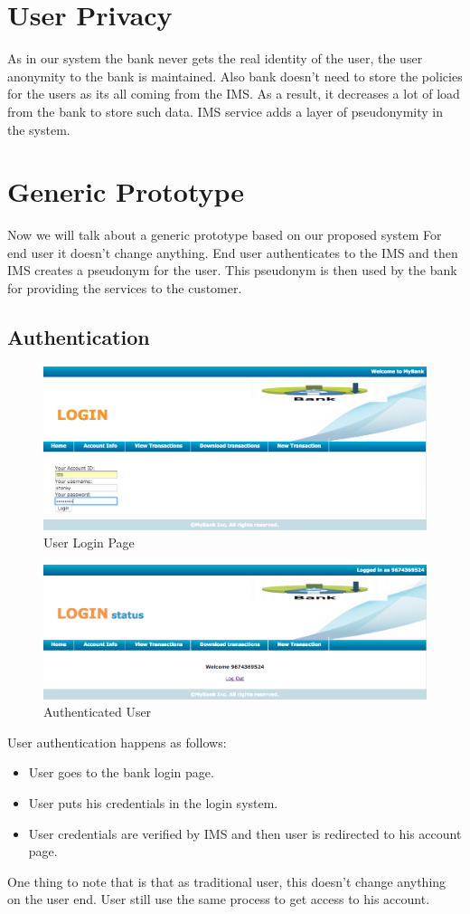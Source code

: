 \section{User Privacy}
As in our system the bank never gets the real identity of the user, the user anonymity to the bank is maintained. Also bank doesn't need to store the policies for the users as its all coming from the IMS. As a result, it decreases a lot of load from the bank to store such data. IMS service adds a layer of pseudonymity in the system. 

\section{Generic Prototype}
Now we will talk about a generic prototype based on our proposed system 
For end user it doesn't change anything. End user authenticates to the IMS and then IMS creates a pseudonym for the user. This pseudonym is then used by the bank for providing the services to the customer.
\subsection{Authentication}
\begin{figure}[h]
	\centering
	\includegraphics[width=\textwidth]{figures/Login}
	\caption{User Login Page}
	\label{fig:Login}
\end{figure}
\begin{figure}[h]
	\centering
	\includegraphics[width=\textwidth]{figures/Logged}
	\caption{Authenticated User}
	\label{fig:Logged}
\end{figure}	
User authentication happens as follows:
\begin{itemize}
	\item User goes to the bank login page.
	\item User puts his credentials in the login system.
	\item User credentials are verified by IMS and then user is redirected to his account page.
\end{itemize}
One thing to note that is that as traditional user, this doesn't change anything on the user end. User still use the same process to get access to his account.

